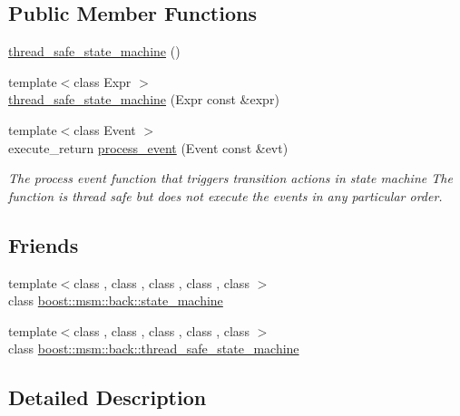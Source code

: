 \subsection*{Public Member Functions}
\begin{DoxyCompactItemize}
\item 
\hyperlink{classboost_1_1msm_1_1back_1_1thread__safe__state__machine_a5b5a31229aed12a1f7036b8b46de0884}{thread\-\_\-safe\-\_\-state\-\_\-machine} ()
\item 
{\footnotesize template$<$class Expr $>$ }\\\hyperlink{classboost_1_1msm_1_1back_1_1thread__safe__state__machine_ad8d554411680bddd9959406c42407c25}{thread\-\_\-safe\-\_\-state\-\_\-machine} (Expr const \&expr)
\item 
{\footnotesize template$<$class Event $>$ }\\execute\-\_\-return \hyperlink{classboost_1_1msm_1_1back_1_1thread__safe__state__machine_a9f38e619a54ce414c4ef737e8873928d}{process\-\_\-event} (Event const \&evt)
\begin{DoxyCompactList}\small\item\em The process event function that triggers transition actions in state machine The function is thread safe but does not execute the events in any particular order. \end{DoxyCompactList}\end{DoxyCompactItemize}
\subsection*{Friends}
\begin{DoxyCompactItemize}
\item 
{\footnotesize template$<$class , class , class , class , class $>$ }\\class \hyperlink{classboost_1_1msm_1_1back_1_1thread__safe__state__machine_a83a2deae1f2169f1234e430beb3b8a95}{boost\-::msm\-::back\-::state\-\_\-machine}
\item 
{\footnotesize template$<$class , class , class , class , class $>$ }\\class \hyperlink{classboost_1_1msm_1_1back_1_1thread__safe__state__machine_a3306dad625847fa2192b045a7789ca5f}{boost\-::msm\-::back\-::thread\-\_\-safe\-\_\-state\-\_\-machine}
\end{DoxyCompactItemize}


\subsection{Detailed Description}
